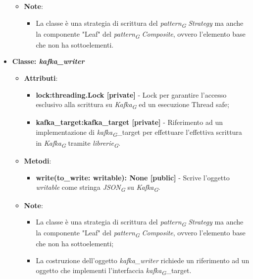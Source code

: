 \begin{itemize}
\begin{itemize}
\begin{itemize}
    \end{itemize}
    \item\textbf{Note}:
        \begin{itemize}
            \item La classe è una strategia di scrittura del \textit{pattern}\textsubscript{\textit{G}} \textit{Strategy} ma anche la componente "Leaf" del \textit{pattern}\textsubscript{\textit{G}} \textit{Composite}, ovvero l'elemento base che non ha sottoelementi.
        \end{itemize}
    \end{itemize}
    \item{\textbf{Classe: \textit{kafka\_writer}}}
    \begin{itemize}
    \item\textbf{Attributi}:
        \begin{itemize}
        \item \textbf{lock:threading.Lock [private]} - Lock per garantire l'accesso esclusivo alla scrittura su \textit{Kafka}\textsubscript{\textit{G}} ed un esecuzione Thread safe;
        \item \textbf{kafka\_target:kafka\_target [private]} - Riferimento ad un implementazione di \textit{kafka}\textsubscript{\textit{G}}\_target per effettuare l'effettiva scrittura in \textit{Kafka}\textsubscript{\textit{G}} tramite \textit{librerie}\textsubscript{\textit{G}}.
    \end{itemize}
    \item \textbf{Metodi}:
    \begin{itemize}
        \item \textbf{write(to\_write: writable): None [public]} - Scrive l'oggetto \textit{writable} come stringa \textit{JSON}\textsubscript{\textit{G}} su \textit{Kafka}\textsubscript{\textit{G}}.
    \end{itemize}
    \item\textbf{Note}:
        \begin{itemize}
            \item La classe è una strategia di scrittura del \textit{pattern}\textsubscript{\textit{G}} \textit{Strategy} ma anche la componente "Leaf" del \textit{pattern}\textsubscript{\textit{G}} \textit{Composite}, ovvero l'elemento base che non ha sottoelementi;
            \item La costruzione dell'oggetto \textit{kafka\_writer} richiede un riferimento ad un oggetto che implementi l'interfaccia \textit{kafka}\textsubscript{\textit{G}}\_target.
        \end{itemize}

\end{itemize}
\end{itemize}
